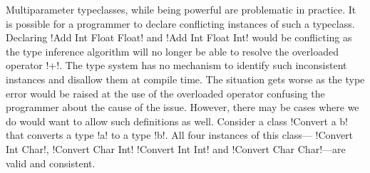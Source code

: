 \documentclass[format=sigplan,manuscript,review,screen,nonacm,margin=1in]{acmart}
\begin{document}
Multiparameter typeclasses, while being powerful are problematic in practice.
It is possible for a programmer to declare conflicting instances of such a typeclass.
Declaring !Add Int Float Float! and !Add Int Float Int!
would be conflicting as the type inference algorithm will no longer be able to resolve
the overloaded operator !+!. The type system has no mechanism
to identify such inconsistent instances and disallow them at compile time. The situation gets worse
as the type error would be raised at the use of the overloaded operator confusing the programmer about the
cause of the issue. However, there may be cases where we do would want to allow such definitions as well.
Consider a class !Convert a b! that converts a type !a! to a type !b!. All four instances of this class---
!Convert Int Char!, !Convert Char Int! !Convert Int Int! and !Convert Char Char!---are valid and consistent.
\end{document}
